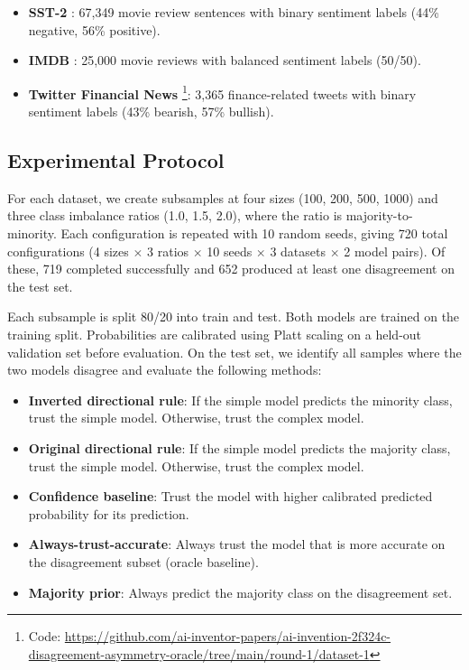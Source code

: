 \documentclass[11pt,letterpaper]{article}
\begin{document}
\begin{itemize}
  \item \textbf{SST-2} \citep{Socher2013}: 67,349 movie review sentences with binary sentiment labels (44\% negative, 56\% positive).
  \item \textbf{IMDB} \citep{Maas2011}: 25,000 movie reviews with balanced sentiment labels (50/50).
  \item \textbf{Twitter Financial News} \footnote{Code: \url{https://github.com/ai-inventor-papers/ai-invention-2f324c-disagreement-asymmetry-oracle/tree/main/round-1/dataset-1}}: 3,365 finance-related tweets with binary sentiment labels (43\% bearish, 57\% bullish).
\end{itemize}

\subsection{Experimental Protocol}

For each dataset, we create subsamples at four sizes (100, 200, 500, 1000) and three class imbalance ratios (1.0, 1.5, 2.0), where the ratio is majority-to-minority. Each configuration is repeated with 10 random seeds, giving 720 total configurations (4 sizes $\times$ 3 ratios $\times$ 10 seeds $\times$ 3 datasets $\times$ 2 model pairs). Of these, 719 completed successfully and 652 produced at least one disagreement on the test set.

Each subsample is split 80/20 into train and test. Both models are trained on the training split. Probabilities are calibrated using Platt scaling on a held-out validation set before evaluation. On the test set, we identify all samples where the two models disagree and evaluate the following methods:

\begin{itemize}
  \item \textbf{Inverted directional rule}: If the simple model predicts the minority class, trust the simple model. Otherwise, trust the complex model.
  \item \textbf{Original directional rule}: If the simple model predicts the majority class, trust the simple model. Otherwise, trust the complex model.
  \item \textbf{Confidence baseline}: Trust the model with higher calibrated predicted probability for its prediction.
  \item \textbf{Always-trust-accurate}: Always trust the model that is more accurate on the disagreement subset (oracle baseline).
  \item \textbf{Majority prior}: Always predict the majority class on the disagreement set.
\end{itemize}
\end{document}
